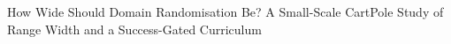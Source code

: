 How Wide Should Domain Randomisation Be? A Small-Scale CartPole Study of Range Width and a Success-Gated Curriculum
